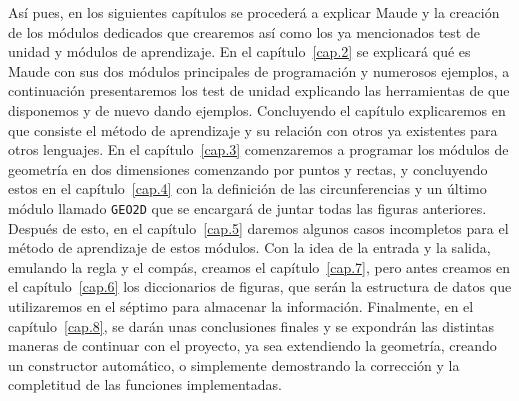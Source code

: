 Así pues, en los siguientes capítulos se procederá a explicar Maude y la creación de los módulos dedicados que crearemos así como los ya mencionados test de unidad y módulos de aprendizaje. En el capítulo~\ref{cap.2} se explicará qué es Maude con sus dos módulos principales de programación y numerosos ejemplos, a continuación presentaremos los test de unidad explicando las herramientas de que disponemos y de nuevo dando ejemplos. Concluyendo el capítulo explicaremos en que consiste el método de aprendizaje y su relación con otros ya existentes para otros lenguajes. En el capítulo~\ref{cap.3} comenzaremos a programar los módulos de geometría en dos dimensiones comenzando por puntos y rectas, y concluyendo estos en el capítulo~\ref{cap.4} con la definición de las circunferencias y un último módulo llamado \texttt{GEO2D} que se encargará de juntar todas las figuras anteriores. Después de esto, en el capítulo~\ref{cap.5} daremos algunos casos incompletos para el método de aprendizaje de estos módulos. Con la idea de la entrada y la salida, emulando la regla y el compás, creamos el capítulo~\ref{cap.7}, pero antes creamos en el capítulo~\ref{cap.6} los diccionarios de figuras, que serán la estructura de datos que utilizaremos en el séptimo para almacenar la información. Finalmente, en el capítulo~\ref{cap.8}, se darán unas conclusiones finales y se expondrán las distintas maneras de continuar con el proyecto, ya sea extendiendo la geometría, creando un constructor automático, o simplemente demostrando la corrección y la completitud de las funciones implementadas.\par

